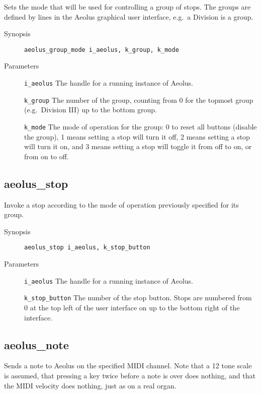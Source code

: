 \documentclass[english,11pt,letterpaper,onecolumn]{scrartcl}
\begin{document}
{Sets the mode that will be used for controlling a group of stops. The groups are defined by lines in the Aeolus graphical user interface, e.g.\ a Division is a group.

\begin{description}
	\item[Synopsis]
	\item[]\lstinline|aeolus_group_mode i_aeolus, k_group, k_mode|
	\item[Parameters]
	\item[]\lstinline|i_aeolus| The handle for a running instance of Aeolus.
	\item[]\lstinline|k_group| The number of the group, counting from 0 for the topmost group (e.g.\ Division III) up to the bottom group.
	\item[]\lstinline|k_mode| The mode of operation for the group: 0 to reset all buttons (disable the group), 1 means setting a stop will turn it off, 2 means setting a stop will turn it on, and 3 means setting a stop will toggle it from off to on, or from on to off.
\end{description}

\subsection*{aeolus\_stop}

Invoke a stop according to the mode of operation previously specified for its group.

\begin{description}
	\item[Synopsis]
	\item[]\lstinline|aeolus_stop i_aeolus, k_stop_button|
	\item[Parameters]
	\item[]\lstinline|i_aeolus| The handle for a running instance of Aeolus.
	\item[]\lstinline|k_stop_button| The number of the stop button. Stops are numbered from 0 at the top left of the user interface on up to the bottom right of the interface.
\end{description}

\subsection*{aeolus\_note}

Sends a note to Aeolus on the specified MIDI channel. Note that a 12 tone scale is assumed, that pressing a key twice before a note is over does nothing, and that the MIDI velocity does nothing, just as on a real organ.

}
\end{document}
